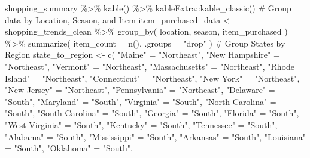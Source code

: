 \documentclass[
  letterpaper,
  DIV=11,
  numbers=noendperiod]{scrartcl}
\newenvironment{Shaded}{\begin{snugshade}}{\end{snugshade}}
\newcommand{\AttributeTok}[1]{\textcolor[rgb]{0.40,0.45,0.13}{#1}}
\newcommand{\CommentTok}[1]{\textcolor[rgb]{0.37,0.37,0.37}{#1}}
\newcommand{\FunctionTok}[1]{\textcolor[rgb]{0.28,0.35,0.67}{#1}}
\newcommand{\NormalTok}[1]{\textcolor[rgb]{0.00,0.23,0.31}{#1}}
\newcommand{\OtherTok}[1]{\textcolor[rgb]{0.00,0.23,0.31}{#1}}
\newcommand{\SpecialCharTok}[1]{\textcolor[rgb]{0.37,0.37,0.37}{#1}}
\newcommand{\StringTok}[1]{\textcolor[rgb]{0.13,0.47,0.30}{#1}}
\begin{document}
\begin{Shaded}
\begin{Highlighting}[]
\NormalTok{shopping\_summary }\SpecialCharTok{\%\textgreater{}\%}
  \FunctionTok{kable}\NormalTok{() }\SpecialCharTok{\%\textgreater{}\%}
\NormalTok{  kableExtra}\SpecialCharTok{::}\FunctionTok{kable\_classic}\NormalTok{()}
\CommentTok{\# Group data by Location, Season, and Item}
\NormalTok{item\_purchased\_data }\OtherTok{\textless{}{-}}\NormalTok{ shopping\_trends\_clean }\SpecialCharTok{\%\textgreater{}\%}
  \FunctionTok{group\_by}\NormalTok{(}
\NormalTok{    location, }
\NormalTok{    season, }
\NormalTok{    item\_purchased}
\NormalTok{  ) }\SpecialCharTok{\%\textgreater{}\%}
  \FunctionTok{summarize}\NormalTok{(}
    \AttributeTok{item\_count =} \FunctionTok{n}\NormalTok{(), }
    \AttributeTok{.groups =} \StringTok{"drop"}
\NormalTok{  )}
\CommentTok{\# Group States by Region}
\NormalTok{state\_to\_region }\OtherTok{\textless{}{-}} \FunctionTok{c}\NormalTok{(}
  \StringTok{"Maine"} \OtherTok{=} \StringTok{"Northeast"}\NormalTok{, }
  \StringTok{"New Hampshire"} \OtherTok{=} \StringTok{"Northeast"}\NormalTok{, }
  \StringTok{"Vermont"} \OtherTok{=} \StringTok{"Northeast"}\NormalTok{, }
  \StringTok{"Massachusetts"} \OtherTok{=} \StringTok{"Northeast"}\NormalTok{,}
  \StringTok{"Rhode Island"} \OtherTok{=} \StringTok{"Northeast"}\NormalTok{,}
  \StringTok{"Connecticut"} \OtherTok{=} \StringTok{"Northeast"}\NormalTok{,}
  \StringTok{"New York"} \OtherTok{=} \StringTok{"Northeast"}\NormalTok{,}
  \StringTok{"New Jersey"} \OtherTok{=} \StringTok{"Northeast"}\NormalTok{,}
  \StringTok{"Pennsylvania"} \OtherTok{=} \StringTok{"Northeast"}\NormalTok{,}
  \StringTok{"Delaware"} \OtherTok{=} \StringTok{"South"}\NormalTok{,}
  \StringTok{"Maryland"} \OtherTok{=} \StringTok{"South"}\NormalTok{,}
  \StringTok{"Virginia"} \OtherTok{=} \StringTok{"South"}\NormalTok{,}
  \StringTok{"North Carolina"} \OtherTok{=} \StringTok{"South"}\NormalTok{,}
  \StringTok{"South Carolina"} \OtherTok{=} \StringTok{"South"}\NormalTok{,}
  \StringTok{"Georgia"} \OtherTok{=} \StringTok{"South"}\NormalTok{,}
  \StringTok{"Florida"} \OtherTok{=} \StringTok{"South"}\NormalTok{,}
  \StringTok{"West Virginia"} \OtherTok{=} \StringTok{"South"}\NormalTok{,}
  \StringTok{"Kentucky"} \OtherTok{=} \StringTok{"South"}\NormalTok{,}
  \StringTok{"Tennessee"} \OtherTok{=} \StringTok{"South"}\NormalTok{,}
  \StringTok{"Alabama"} \OtherTok{=} \StringTok{"South"}\NormalTok{,}
  \StringTok{"Mississippi"} \OtherTok{=} \StringTok{"South"}\NormalTok{,}
  \StringTok{"Arkansas"} \OtherTok{=} \StringTok{"South"}\NormalTok{,}
  \StringTok{"Louisiana"} \OtherTok{=} \StringTok{"South"}\NormalTok{,}
  \StringTok{"Oklahoma"} \OtherTok{=} \StringTok{"South"}\NormalTok{,}

\end{Highlighting}
\end{Shaded}
\end{document}
